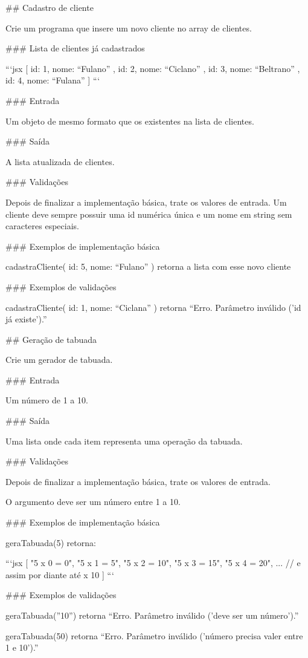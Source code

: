 ## Cadastro de cliente

Crie um programa que insere um novo cliente no array de clientes.

### Lista de clientes já cadastrados

```jsx
[
	{ id: 1, nome: “Fulano” },
	{ id: 2, nome: “Ciclano” },
	{ id: 3, nome: “Beltrano” },
	{ id: 4, nome: “Fulana” }
]
```

### Entrada

Um objeto de mesmo formato que os existentes na lista de clientes.

### Saída

A lista atualizada de clientes.

### Validações

Depois de finalizar a implementação básica, trate os valores de entrada. Um cliente deve sempre possuir uma id numérica única e um nome em string sem caracteres especiais.

### Exemplos de implementação básica

cadastraCliente({ id: 5, nome: “Fulano” }) retorna a lista com esse novo cliente

### Exemplos de validações

cadastraCliente({ id: 1, nome: “Ciclana” }) retorna “Erro. Parâmetro inválido (’id já existe’).”

## Geração de tabuada

Crie um gerador de tabuada.

### Entrada

Um número de 1 a 10.

### Saída

Uma lista onde cada item representa uma operação da tabuada.

### Validações

Depois de finalizar a implementação básica, trate os valores de entrada.

O argumento deve ser um número entre 1 a 10.

### Exemplos de implementação básica

geraTabuada(5) retorna:

```jsx
[
	"5 x 0 = 0",
	"5 x 1 = 5",
	"5 x 2 = 10",
	"5 x 3 = 15",
	"5 x 4 = 20",
	... // e assim por diante até x 10
]
```

### Exemplos de validações

geraTabuada(”10”) retorna “Erro. Parâmetro inválido (’deve ser um número’).”

geraTabuada(50) retorna “Erro. Parâmetro inválido (’número precisa valer entre 1 e 10’).”